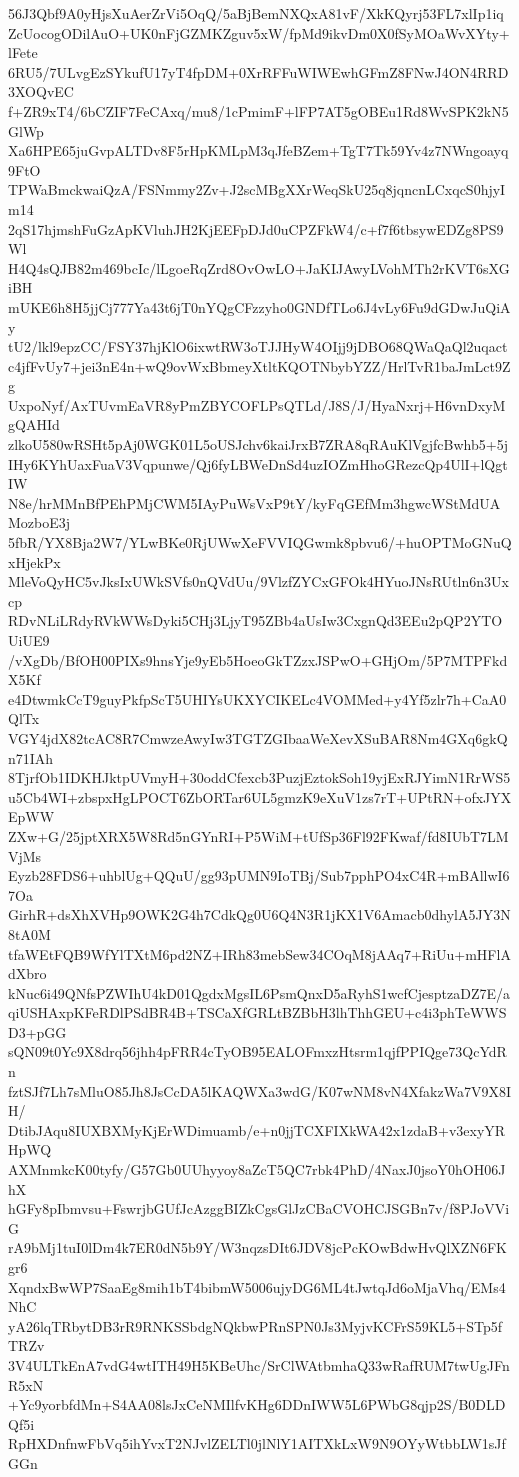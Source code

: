 56J3Qbf9A0yHjsXuAerZrVi5OqQ/5aBjBemNXQxA81vF/XkKQyrj53FL7xlIp1iq
ZcUocogODilAuO+UK0nFjGZMKZguv5xW/fpMd9ikvDm0X0fSyMOaWvXYty+lFete
6RU5/7ULvgEzSYkufU17yT4fpDM+0XrRFFuWIWEwhGFmZ8FNwJ4ON4RRD3XOQvEC
f+ZR9xT4/6bCZIF7FeCAxq/mu8/1cPmimF+lFP7AT5gOBEu1Rd8WvSPK2kN5GlWp
Xa6HPE65juGvpALTDv8F5rHpKMLpM3qJfeBZem+TgT7Tk59Yv4z7NWngoayq9FtO
TPWaBmckwaiQzA/FSNmmy2Zv+J2scMBgXXrWeqSkU25q8jqncnLCxqcS0hjyIm14
2qS17hjmshFuGzApKVluhJH2KjEEFpDJd0uCPZFkW4/c+f7f6tbsywEDZg8PS9Wl
H4Q4sQJB82m469bcIc/lLgoeRqZrd8OvOwLO+JaKIJAwyLVohMTh2rKVT6sXGiBH
mUKE6h8H5jjCj777Ya43t6jT0nYQgCFzzyho0GNDfTLo6J4vLy6Fu9dGDwJuQiAy
tU2/lkl9epzCC/FSY37hjKlO6ixwtRW3oTJJHyW4OIjj9jDBO68QWaQaQl2uqact
c4jfFvUy7+jei3nE4n+wQ9ovWxBbmeyXtltKQOTNbybYZZ/HrlTvR1baJmLct9Zg
UxpoNyf/AxTUvmEaVR8yPmZBYCOFLPsQTLd/J8S/J/HyaNxrj+H6vnDxyMgQAHId
zlkoU580wRSHt5pAj0WGK01L5oUSJchv6kaiJrxB7ZRA8qRAuKlVgjfcBwhb5+5j
IHy6KYhUaxFuaV3Vqpunwe/Qj6fyLBWeDnSd4uzIOZmHhoGRezcQp4UlI+lQgtIW
N8e/hrMMnBfPEhPMjCWM5IAyPuWsVxP9tY/kyFqGEfMm3hgwcWStMdUAMozboE3j
5fbR/YX8Bja2W7/YLwBKe0RjUWwXeFVVIQGwmk8pbvu6/+huOPTMoGNuQxHjekPx
MleVoQyHC5vJksIxUWkSVfs0nQVdUu/9VlzfZYCxGFOk4HYuoJNsRUtln6n3Uxcp
RDvNLiLRdyRVkWWsDyki5CHj3LjyT95ZBb4aUsIw3CxgnQd3EEu2pQP2YTOUiUE9
/vXgDb/BfOH00PIXs9hnsYje9yEb5HoeoGkTZzxJSPwO+GHjOm/5P7MTPFkdX5Kf
e4DtwmkCcT9guyPkfpScT5UHIYsUKXYCIKELc4VOMMed+y4Yf5zlr7h+CaA0QlTx
VGY4jdX82tcAC8R7CmwzeAwyIw3TGTZGIbaaWeXevXSuBAR8Nm4GXq6gkQn71IAh
8TjrfOb1IDKHJktpUVmyH+30oddCfexcb3PuzjEztokSoh19yjExRJYimN1RrWS5
u5Cb4WI+zbspxHgLPOCT6ZbORTar6UL5gmzK9eXuV1zs7rT+UPtRN+ofxJYXEpWW
ZXw+G/25jptXRX5W8Rd5nGYnRI+P5WiM+tUfSp36Fl92FKwaf/fd8IUbT7LMVjMs
Eyzb28FDS6+uhblUg+QQuU/gg93pUMN9IoTBj/Sub7pphPO4xC4R+mBAllwI67Oa
GirhR+dsXhXVHp9OWK2G4h7CdkQg0U6Q4N3R1jKX1V6Amacb0dhylA5JY3N8tA0M
tfaWEtFQB9WfYlTXtM6pd2NZ+IRh83mebSew34COqM8jAAq7+RiUu+mHFlAdXbro
kNuc6i49QNfsPZWIhU4kD01QgdxMgsIL6PsmQnxD5aRyhS1wcfCjesptzaDZ7E/a
qiUSHAxpKFeRDlPSdBR4B+TSCaXfGRLtBZBbH3lhThhGEU+c4i3phTeWWSD3+pGG
sQN09t0Yc9X8drq56jhh4pFRR4cTyOB95EALOFmxzHtsrm1qjfPPIQge73QcYdRn
fztSJf7Lh7sMluO85Jh8JsCcDA5lKAQWXa3wdG/K07wNM8vN4XfakzWa7V9X8IH/
DtibJAqu8IUXBXMyKjErWDimuamb/e+n0jjTCXFIXkWA42x1zdaB+v3exyYRHpWQ
AXMnmkcK00tyfy/G57Gb0UUhyyoy8aZcT5QC7rbk4PhD/4NaxJ0jsoY0hOH06JhX
hGFy8pIbmvsu+FswrjbGUfJcAzggBIZkCgsGlJzCBaCVOHCJSGBn7v/f8PJoVViG
rA9bMj1tuI0lDm4k7ER0dN5b9Y/W3nqzsDIt6JDV8jcPcKOwBdwHvQlXZN6FKgr6
XqndxBwWP7SaaEg8mih1bT4bibmW5006ujyDG6ML4tJwtqJd6oMjaVhq/EMs4NhC
yA26lqTRbytDB3rR9RNKSSbdgNQkbwPRnSPN0Js3MyjvKCFrS59KL5+STp5fTRZv
3V4ULTkEnA7vdG4wtITH49H5KBeUhc/SrClWAtbmhaQ33wRafRUM7twUgJFnR5xN
+Yc9yorbfdMn+S4AA08lsJxCeNMIlfvKHg6DDnIWW5L6PWbG8qjp2S/B0DLDQf5i
RpHXDnfnwFbVq5ihYvxT2NJvlZELTl0jlNlY1AITXkLxW9N9OYyWtbbLW1sJfGGn
